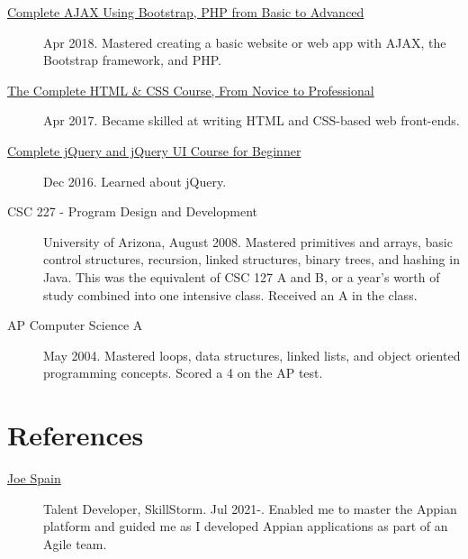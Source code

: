 \documentclass{article}
\begin{document}
\begin{description}
  \item [\href{https://www.udemy.com/certificate/UC-E3EMJE4O}{Complete AJAX Using Bootstrap, PHP from Basic to Advanced}] Apr 2018. Mastered creating a basic website or web app with AJAX, the Bootstrap framework, and PHP.
  \item [\href{https://www.udemy.com/certificate/UC-QZDWYX3V}{The Complete HTML \& CSS Course, From Novice to Professional}] Apr 2017. Became skilled at writing HTML and CSS-based web front-ends.
  \item [\href{https://www.udemy.com/certificate/UC-4V285L2N}{Complete jQuery and jQuery UI Course for Beginner}] Dec 2016. Learned about jQuery.
  \item [CSC 227 - Program Design and Development] University of Arizona, August 2008. Mastered primitives and arrays, basic control structures, recursion, linked structures, binary trees, and hashing in Java. This was the equivalent of CSC 127 A and B, or a year's worth of study combined into one intensive class. Received an A in the class.
  \item [AP Computer Science A] May 2004. Mastered loops, data structures, linked lists, and object oriented programming concepts. Scored a 4 on the AP test.
\end{description}

\vspace{-1em}
\section*{References}\vspace{-0.5em}
\begin{description}
  \item [\href{https://www.linkedin.com/in/joespain/}{Joe Spain}] Talent Developer, SkillStorm. Jul 2021-. Enabled me to master the Appian platform and guided me as I developed Appian applications as part of an Agile team.
\end{description}
\end{document}
